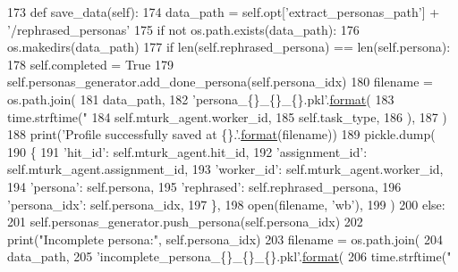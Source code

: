 \begin{DoxyCode}
173     \textcolor{keyword}{def }save\_data(self):
174         data\_path = self.opt[\textcolor{stringliteral}{'extract\_personas\_path'}] + \textcolor{stringliteral}{'/rephrased\_personas'}
175         \textcolor{keywordflow}{if} \textcolor{keywordflow}{not} os.path.exists(data\_path):
176             os.makedirs(data\_path)
177         \textcolor{keywordflow}{if} len(self.rephrased\_persona) == len(self.persona):
178             self.completed = \textcolor{keyword}{True}
179             self.personas\_generator.add\_done\_persona(self.persona\_idx)
180             filename = os.path.join(
181                 data\_path,
182                 \textcolor{stringliteral}{'persona\_\{\}\_\{\}\_\{\}.pkl'}.\hyperlink{namespaceparlai_1_1chat__service_1_1services_1_1messenger_1_1shared__utils_a32e2e2022b824fbaf80c747160b52a76}{format}(
183                     time.strftime(\textcolor{stringliteral}{"%
184                     self.mturk\_agent.worker\_id,
185                     self.task\_type,
186                 ),
187             )
188             print(\textcolor{stringliteral}{'Profile successfully saved at \{\}.'}.\hyperlink{namespaceparlai_1_1chat__service_1_1services_1_1messenger_1_1shared__utils_a32e2e2022b824fbaf80c747160b52a76}{format}(filename))
189             pickle.dump(
190                 \{
191                     \textcolor{stringliteral}{'hit\_id'}: self.mturk\_agent.hit\_id,
192                     \textcolor{stringliteral}{'assignment\_id'}: self.mturk\_agent.assignment\_id,
193                     \textcolor{stringliteral}{'worker\_id'}: self.mturk\_agent.worker\_id,
194                     \textcolor{stringliteral}{'persona'}: self.persona,
195                     \textcolor{stringliteral}{'rephrased'}: self.rephrased\_persona,
196                     \textcolor{stringliteral}{'persona\_idx'}: self.persona\_idx,
197                 \},
198                 open(filename, \textcolor{stringliteral}{'wb'}),
199             )
200         \textcolor{keywordflow}{else}:
201             self.personas\_generator.push\_persona(self.persona\_idx)
202             print(\textcolor{stringliteral}{"Incomplete persona:"}, self.persona\_idx)
203             filename = os.path.join(
204                 data\_path,
205                 \textcolor{stringliteral}{'incomplete\_persona\_\{\}\_\{\}\_\{\}.pkl'}.\hyperlink{namespaceparlai_1_1chat__service_1_1services_1_1messenger_1_1shared__utils_a32e2e2022b824fbaf80c747160b52a76}{format}(
206                     time.strftime(\textcolor{stringliteral}{"%
}}
\end{DoxyCode}

